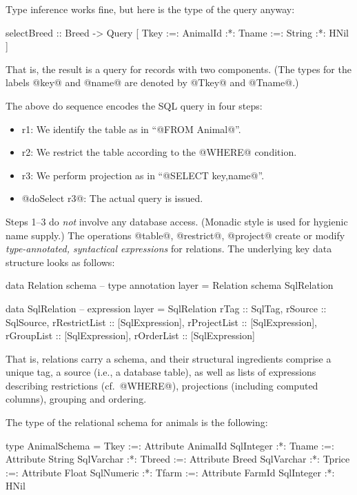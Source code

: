 \documentclass[nocopyrightspace,preprint]{sigplan-proc}
\begin{document}
Type inference works fine, but here is the type of the query anyway:

\begin{code}
 selectBreed :: Breed -> Query [
    Tkey   :=: AnimalId :*:
    Tname  :=: String   :*: HNil ]
\end{code}

That is, the result is a query for records with two components. (The
types for the labels @key@ and @name@ are denoted by @Tkey@ and
@Tname@.) 

The above do sequence encodes the SQL query in four steps:
%
\begin{itemize}
\item r1: We identify the table as in ``@FROM Animal@''.
\item r2: We restrict the table according to the @WHERE@ condition.
\item r3: We perform projection as in ``@SELECT key,name@''.
\item @doSelect r3@: The actual query is issued.
\end{itemize}
%
Steps 1--3 do \emph{not} involve any database access.  (Monadic style
is used for hygienic name supply.)  The operations @table@,
@restrict@, @project@ create or modify \emph{type-annotated,
syntactical expressions} for relations. The underlying key data
structure looks as follows:

\begin{code}
 data Relation schema  -- type annotation layer
   =  Relation schema SqlRelation
\end{code}

\begin{code}
 data SqlRelation      -- expression layer
   =  SqlRelation {
    rTag           :: SqlTag,
    rSource        :: SqlSource, 
    rRestrictList  :: [SqlExpression],
    rProjectList   :: [SqlExpression],
    rGroupList     :: [SqlExpression],
    rOrderList     :: [SqlExpression] }
\end{code}

That is, relations carry a schema, and their structural ingredients
comprise a unique tag, a source (i.e., a database table), as well as
lists of expressions describing restrictions (cf.\ @WHERE@),
projections (including computed columns), grouping and ordering.

The type of the relational schema for animals is the following:

\begin{code}
 type AnimalSchema =
   Tkey   :=: Attribute AnimalId SqlInteger :*:
   Tname  :=: Attribute String   SqlVarchar :*:
   Tbreed :=: Attribute Breed    SqlVarchar :*:
   Tprice :=: Attribute Float    SqlNumeric :*:
   Tfarm  :=: Attribute FarmId   SqlInteger :*: HNil
\end{code}
\end{document}
